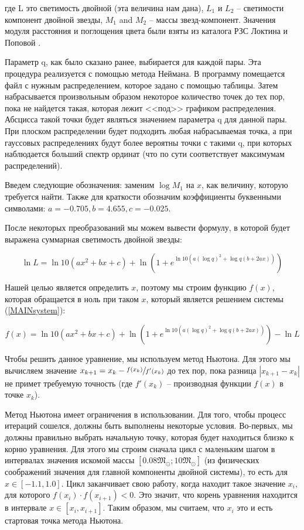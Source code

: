 \documentclass[a4paper,12pt]{article}
\begin{document}
где L это светимость двойной (эта величина нам дана),
$L_1$ и $L_2 $ -- светимости компонент двойной звезды,
$M_1$ and $M_2$ -- массы звезд-компонент.
Значения модуля расстояния и поглощения цвета были взяты из каталога РЗС Локтина и Поповой \cite{LoPo}.

Параметр q, как было сказано ранее, выбирается для каждой пары. Эта процедура реализуется с помощью метода Неймана. В программу помещается файл с нужным распределением, которое задано с помощью таблицы. Затем набрасывается произвольным образом некоторое количество точек до тех пор, пока не найдется такая, которая лежит <<под>> графиком распределения. Абсцисса такой точки будет являться значением параметра q для данной пары. При плоском распределении будет подходить любая набрасываемая точка, а при гауссовых распределениях будут более вероятны точки с такими q, при которых наблюдается больший спектр ординат (что по сути соответствует максимумам распределений).

Введем следующие обозначения: заменим $\log{M_1}$ на $x$, как величину, которую требуется найти. Также для краткости обозначим коэффициенты буквенными символами: $a=-0.705 ,b=4.655, c=- 0.025$.

После некоторых преобразований мы можем вывести формулу, в которой будет выражена суммарная светимость двойной звезды:

\begin{equation}
\ln{L} = \ln{10} (ax^2+bx+c)+\ln{(1 + e^{\ln{10}(a(\log {q})^2+\log {q}(b+2ax))})}
\end{equation}

Нашей целью является определить $x$, поэтому мы строим функцию $f(x)$, которая обращается в ноль при таком $x$, который является решением системы (\ref{MAINsystem}):

\begin{equation}
f(x)=\ln{10} (ax^2+bx+c)+\ln{(1 + e^{\ln{10}(a(\log {q})^2+\log {q}(b+2ax))})} - \ln{L}
\end{equation}

Чтобы решить данное уравнение, мы используем метод Ньютона. Для этого мы вычисляем значение $x_{k+1}=x_k-\sfrac{f(x_k)}{f'(x_k)}$ до тех пор, пока разница $|x_{k+1} - x_k|$ не примет требуемую точность (где $f'(x_k)$ -- производная функции $f(x)$ в точке $x_k$). 

Метод Ньютона имеет ограничения в использовании. Для того, чтобы процесс итераций сошелся, должны быть выполнены некоторые условия.
Во-первых, мы должны правильно выбрать начальную точку, которая будет находиться близко к корню уравнения. Для этого мы строим сначала цикл с маленьким шагом в интервалах значения искомой массы $[0.08 \mathfrak{M}_{\odot};10 \mathfrak{M}_{\odot}]$ (из физических соображений значения для главной компоненты двойной системы), то есть для $x \in [-1.1,1.0]$. Цикл заканчивает свою работу, когда находит такое значение $x_i$, для которого $f(x_i)\cdot f(x_{i+1}) <0$. Это значит, что корень уравнения находится в интервале $x \in [x_i,x_{i+1}]$. Таким образом, мы считаем, что $x_i$ это и есть стартовая точка метода Ньютона.
\end{document}
